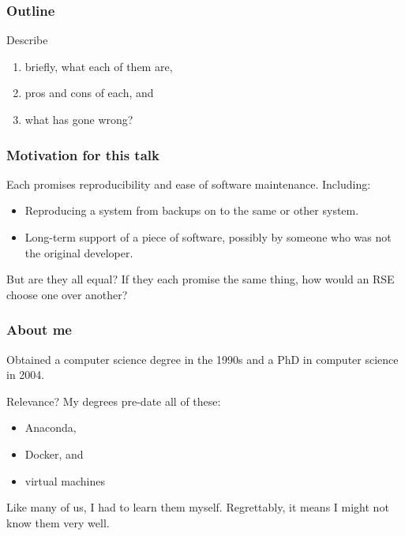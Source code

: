 \documentclass[11pt,aspectratio=43,ignorenonframetext,t]{beamer}
\begin{document}
\begin{frame}

\frametitle{Outline}

Describe
\begin{enumerate}
  \item briefly, what each of them are,
  \item pros and cons of each, and
  \item what has gone wrong?
\end{enumerate}

\end{frame}


\begin{frame}

\frametitle{Motivation for this talk}

Each promises reproducibility and ease of software maintenance.  Including:
\vs

\begin{itemize}
  \item Reproducing a system from backups on to the same or other system.
  \item Long-term support of a piece of software, possibly by someone who was not the original developer.
\end{itemize}
\vs

But are they all equal?  If they each promise the same thing, how would an RSE choose one over another?

\end{frame}


\begin{frame}

\frametitle{About me}

Obtained a computer science degree in the 1990s and a PhD in computer science in 2004.
\vs

Relevance?  My degrees pre-date all of these:
\begin{itemize}
  \item Anaconda, 
  \item Docker, and
  \item virtual machines
\end{itemize}
\vs

Like many of us, I had to learn them myself.  Regrettably, it means I might not know them very well.

\end{frame}
\end{document}
